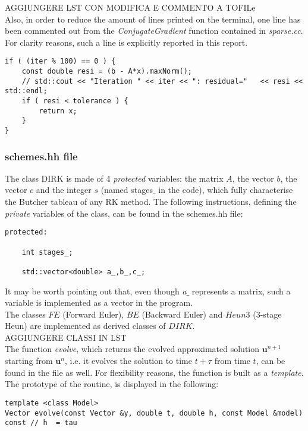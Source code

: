 \documentclass[11pt]{article}
\theoremstyle{theorem}
\theoremstyle{definition}
\begin{document}
AGGIUNGERE LST CON MODIFICA E COMMENTO A TOFILe\\

Also, in order to reduce the amount of lines printed on the terminal, one line has been commented out from the \emph{ConjugateGradient} function contained in \emph{sparse.cc}. For clarity reasons, such a line is explicitly reported in this report.\\

\begin{lstlisting}
if ( (iter % 100) == 0 ) {
	const double resi = (b - A*x).maxNorm();
	// std::cout << "Iteration " << iter << ": residual=" 	<< resi << std::endl;
	if ( resi < tolerance ) {
		return x;
	}
}
\end{lstlisting}


\subsubsection{schemes.hh file}
\label{subsubsec:schemes}
The class DIRK is made of 4 \emph{protected} variables: the matrix $A$, the vector $b$, the vector $c$ and the integer $s$ (named stages$\_$ in the code), which fully characterise the Butcher tableau of any RK method. The following instructions, defining the \emph{private} variables of the class, can be found in the schemes.hh file:

\begin{lstlisting}
protected:

	int stages_;

	std::vector<double> a_,b_,c_;
\end{lstlisting}

It may be worth pointing out that, even though \emph{a$\_$} represents a matrix, such a variable is implemented as a vector in the program.\\
The classes $FE$ (Forward Euler), $BE$ (Backward Euler) and $Heun3$ (3-stage Heun) are implemented as derived classes of $DIRK$.\\

AGGIUNGERE CLASSI IN LST\\


The function \emph{evolve}, which returns the evolved approximated solution $\mathbf{u}^{n+1}$ starting from $\mathbf{u}^n$, i.e. it evolves the solution to time $t+\tau$ from time $t$, can be found in the file as well. For flexibility reasons, the function is built as a \emph{template}. The prototype of the routine, is displayed in the following:

\begin{lstlisting}
template <class Model>
Vector evolve(const Vector &y, double t, double h, const Model &model) const // h  = tau
\end{lstlisting}
\end{document}
